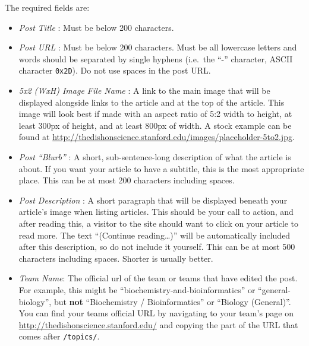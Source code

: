\documentclass[paper=a4, fontsize=11pt]{scrartcl}
\numberwithin{equation}{section}        %
\numberwithin{figure}{section}            %
\numberwithin{table}{section}                %
\newcommand{\dishurlplain}[1]{http://thedishonscience.stanford.edu/#1}
\newcommand{\dishurl}[1]{\url{\dishurlplain{#1}}}
\begin{document}
\noindent{}The required fields are:\@
\begin{itemize}
    \item \emph{Post Title} : Must be below 200 characters.
    \item \emph{Post URL} : Must be below 200 characters.
        Must be all lowercase letters and words should be separated by single
        hyphens (i.e.\ the ``-'' character, ASCII character \texttt{0x2D}). Do
        not use spaces in the post URL.
    \item \emph{5x2 (WxH) Image File Name} : A link to the main image that will be
        displayed alongside links to the article and at the top of the article.
        This image will look best if made with an aspect ratio of 5:2 width to
        height, at least 300px of height, and at least 800px of width. A stock
        example can be found at \dishurl{images/placeholder-5to2.jpg}.
    \item \emph{Post ``Blurb''} : A short, sub-sentence-long description of what
        the article is about. If you want your article to have a subtitle, this
        is the most appropriate place. This can be at most 200 characters
        including spaces.
    \item \emph{Post Description} : A short paragraph that will be displayed
        beneath your article's image when listing articles. This should be your
        call to action, and after reading this, a visitor to the site should
        want to click on your article to read more. The text ``(Continue
        reading\ldots{})'' will be automatically included after this description, so do
        not include it yourself. This can be at most 500 characters including
        spaces. Shorter is usually better.
    \item \emph{Team Name}: The official url of the team or teams that have edited the
        post. For example, this might be ``biochemistry-and-bioinformatics'' or
        ``general-biology'', but \textbf{not} ``Biochemistry / Bioinformatics'' or
        ``Biology (General)''. You can find your teams official URL by navigating
        to your team's page on \dishurl{} and copying the part of the URL
        that comes after \texttt{/topics/}.
\end{itemize}
\end{document}
